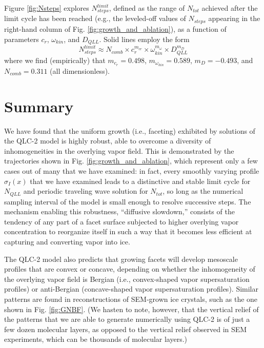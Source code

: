 \documentclass[draft]{agujournal2019}
\begin{document}
Figure \ref{fig:Nsteps} explores $N_{steps}^{limit}$, defined as the range of $N_{tot}$ achieved after the limit cycle has been reached (e.g., the leveled-off values of $N_{steps}$ appearing in the right-hand column of Fig. \ref{fig:growth_and_ablation}), as a function of parameters $c_r$, $\omega_{kin}$, and $D_{QLL}$. Solid lines employ the form
\begin{equation}
    N_{steps}^{limit} \approx N_{comb} 
    \times c_r^{m_{cr}} 
    \times \omega_{kin}^{m_\omega}
    \times D_{QLL}^{m_D}
    \label{eq:N_steps}
\end{equation}
where we find (empirically) that $m_{c_r}=0.498$, $m_{\omega_{kin}}=0.589$, $m_D=-0.493$, and $N_{comb}=0.311$ (all dimensionless).



\section{Summary}

We have found that the uniform growth (i.e., faceting) exhibited by solutions of the QLC-2 model is highly robust, able to overcome a diversity of inhomogeneities in the overlying vapor field. This is demonstrated by the trajectories shown in Fig. \ref{fig:growth_and_ablation}, which represent only a few cases out of many that we have examined: in fact, every smoothly varying profile $\sigma_I(x)$ that we have examined leads to a distinctive and stable limit cycle for $N_{QLL}$ and periodic traveling wave solution for $N_{tot}$, so long as the numerical sampling interval of the model is small enough to resolve successive steps. The mechanism enabling this robustness, ``diffusive slowdown,'' consists of the tendency of any part of a facet surface subjected to higher overlying vapor concentration to reorganize itself in such a way that it becomes less efficient at capturing and converting vapor into ice.

The QLC-2 model also predicts that growing facets will develop mesoscale profiles that are convex or concave, depending on whether the inhomogeneity of the overlying vapor field is Bergian (i.e., convex-shaped vapor supersaturation profiles) or anti-Bergian (concave-shaped vapor supersaturation profiles). Similar patterns are found in reconstructions of SEM-grown ice crystals, such as the one shown in Fig. \ref{fig:GNBF}. (We hasten to note, however, that the vertical relief of the patterns that we are able to generate numerically using QLC-2 is of just a few dozen molecular layers, as opposed to the vertical relief observed in SEM experiments, which can be thousands of molecular layers.)
\end{document}
